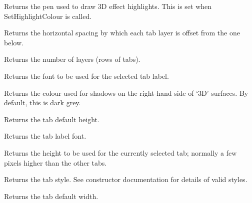 
Returns the pen used to draw 3D effect highlights. This is set when
SetHighlightColour is called. 



Returns the horizontal spacing by which each tab layer is offset from the one below.



Returns the number of layers (rows of tabs).



Returns the font to be used for the selected tab label.



Returns the colour used for shadows on the right-hand side of `3D' surfaces. By default, this is dark grey.



Returns the tab default height.



Returns the tab label font.



Returns the height to be used for the currently selected tab; normally a few pixels
higher than the other tabs.



Returns the tab style. See constructor documentation for details of valid styles.



Returns the tab default width.

